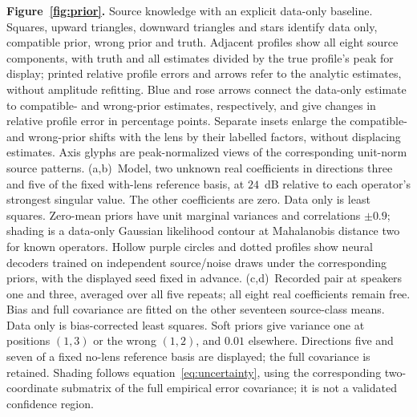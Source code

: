 \documentclass[lineno,pdflatex,sn-nature]{sn-jnl}%
\theoremstyle{thmstyleone}%
\theoremstyle{thmstyletwo}%
\theoremstyle{thmstylethree}%
\begin{document}
\noindent\textbf{Figure~\ref{fig:prior}.} Source knowledge with an explicit data-only baseline. Squares, upward triangles, downward triangles and stars identify data only, compatible prior, wrong prior and truth. Adjacent profiles show all eight source components, with truth and all estimates divided by the true profile's peak for display; printed relative profile errors and arrows refer to the analytic estimates, without amplitude refitting. Blue and rose arrows connect the data-only estimate to compatible- and wrong-prior estimates, respectively, and give changes in relative profile error in percentage points. Separate insets enlarge the compatible- and wrong-prior shifts with the lens by their labelled factors, without displacing estimates. Axis glyphs are peak-normalized views of the corresponding unit-norm source patterns. (a,b)~Model, two unknown real coefficients in directions three and five of the fixed with-lens reference basis, at $24$~dB relative to each operator's strongest singular value. The other coefficients are zero. Data only is least squares. Zero-mean priors have unit marginal variances and correlations $\pm0.9$; shading is a data-only Gaussian likelihood contour at Mahalanobis distance two for known operators. Hollow purple circles and dotted profiles show neural decoders trained on independent source/noise draws under the corresponding priors, with the displayed seed fixed in advance. (c,d)~Recorded pair at speakers one and three, averaged over all five repeats; all eight real coefficients remain free. Bias and full covariance are fitted on the other seventeen source-class means. Data only is bias-corrected least squares. Soft priors give variance one at positions $(1,3)$ or the wrong $(1,2)$, and $0.01$ elsewhere. Directions five and seven of a fixed no-lens reference basis are displayed; the full covariance is retained. Shading follows equation~\eqref{eq:uncertainty}, using the corresponding two-coordinate submatrix of the full empirical error covariance; it is not a validated confidence region.
\par
\end{document}
